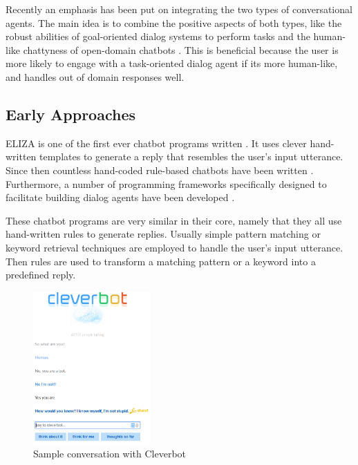 \documentclass[12pt]{article}
\begin{document}
Recently an emphasis has been put on integrating the two types of conversational agents. The main idea is to combine the positive aspects of both types, like the robust abilities of goal-oriented dialog systems to perform tasks and the human-like chattyness of open-domain chatbots \cite{Zhao:2017,Yu:2017,Serban:2017}. This is beneficial because the user is more likely to engage with a task-oriented dialog agent if its more human-like, and handles out of domain responses well.

\subsection{Early Approaches} \label{ssec:22}

ELIZA is one of the first ever chatbot programs written \cite{Weizenbaum:1966}. It uses clever hand-written templates to generate a reply that resembles the user's input utterance. Since then countless hand-coded rule-based chatbots have been written \cite{Wallace:2009,Cleverbot:2017,Mitsuku:2017}. Furthermore, a number of programming frameworks specifically designed to facilitate building dialog agents have been developed \cite{Marietto:2013,Microsoft:2017}.

These chatbot programs are very similar in their core, namely that they all use hand-written rules to generate replies. Usually simple pattern matching or keyword retrieval techniques are employed to handle the user's input utterance. Then rules are used to transform a matching pattern or a keyword into a predefined reply.

\begin{figure}[H]
	\centering
	\includegraphics[width=0.4\textwidth]{pics/cleverbot.png}
	\caption{Sample conversation with Cleverbot \cite{Cleverbot:2017}}
\end{figure}
\end{document}
